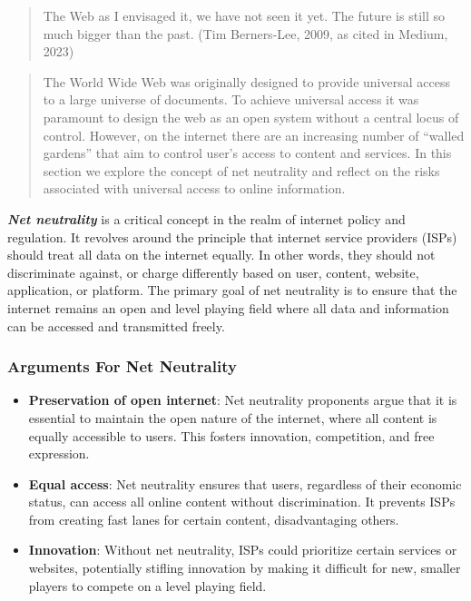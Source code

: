 \documentclass[
  letterpaper,
  DIV=11,
  numbers=noendperiod]{scrreprt}
\providecommand{\tightlist}{%
  \setlength{\itemsep}{0pt}\setlength{\parskip}{0pt}}\usepackage{longtable,booktabs,array}
\begin{document}
\begin{quote}
The Web as I envisaged it, we have not seen it yet. The future is still
so much bigger than the past. (Tim Berners-Lee, 2009, as cited in
Medium, 2023)
\end{quote}

\begin{quote}
The World Wide Web was originally designed to provide universal access
to a large universe of documents. To achieve universal access it was
paramount to design the web as an open system without a central locus of
control. However, on the internet there are an increasing number of
``walled gardens'' that aim to control user's access to content and
services. In this section we explore the concept of net neutrality and
reflect on the risks associated with universal access to online
information.
\end{quote}

\textbf{\emph{Net neutrality}} is a critical concept in the realm of
internet policy and regulation. It revolves around the principle that
internet service providers (ISPs) should treat all data on the internet
equally. In other words, they should not discriminate against, or charge
differently based on user, content, website, application, or platform.
The primary goal of net neutrality is to ensure that the internet
remains an open and level playing field where all data and information
can be accessed and transmitted freely.

\subsubsection*{Arguments For Net
Neutrality}\label{arguments-for-net-neutrality}

\begin{itemize}
\tightlist
\item
  \textbf{Preservation of open internet}: Net neutrality proponents
  argue that it is essential to maintain the open nature of the
  internet, where all content is equally accessible to users. This
  fosters innovation, competition, and free expression.
\item
  \textbf{Equal access}: Net neutrality ensures that users, regardless
  of their economic status, can access all online content without
  discrimination. It prevents ISPs from creating fast lanes for certain
  content, disadvantaging others.
\item
  \textbf{Innovation}: Without net neutrality, ISPs could prioritize
  certain services or websites, potentially stifling innovation by
  making it difficult for new, smaller players to compete on a level
  playing field.
\end{itemize}
\end{document}
